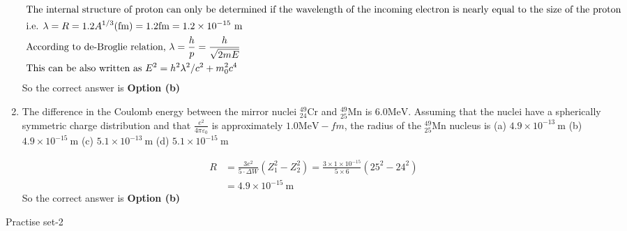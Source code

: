 \begin{enumerate}
\begin{tasks}
	\end{tasks}
\begin{answer}
	\begin{align*}
	\intertext{ The internal structure of proton can only be determined if the wavelength of the incoming electron is nearly equal to the size of the proton}
&\text{	i.e. $\lambda=R=1.2 A^{1 / 3}(\mathrm{fm})=1.2 \mathrm{fm}=1.2 \times 10^{-15} \mathrm{~m}$}\\
	&\text { According to de-Broglie relation, } \lambda=\frac{h}{p}=\frac{h}{\sqrt{2 m E}}\\
&\text { This can be also written as } E^2=h^2 \lambda^2 / c^2+m_0^2 c^4
	\end{align*}
	So the correct answer is \textbf{Option (b)}
\end{answer}
	\item  The difference in the Coulomb energy between the mirror nuclei ${ }_{24}^{49} \mathrm{Cr}$ and ${ }_{25}^{49} \mathrm{Mn}$ is $6.0 \mathrm{MeV}$. Assuming that the nuclei have a spherically symmetric charge distribution and that $\frac{e^2}{4 \pi \varepsilon_0}$ is approximately $1.0 \mathrm{MeV}-f m$, the radius of the ${ }_{25}^{49} \mathrm{Mn}$ nucleus is
	(a) $4.9 \times 10^{-13} \mathrm{~m}$
	(b) $4.9 \times 10^{-15} \mathrm{~m}$
	(c) $5.1 \times 10^{-13} \mathrm{~m}$
	(d) $5.1 \times 10^{-15} \mathrm{~m}$
	\begin{answer}
		\begin{align*}
		R&=\frac{3 e^2}{5 \cdot \Delta W}\left(Z_1^2-Z_2^2\right)=\frac{3 \times 1 \times 10^{-15}}{5 \times 6}\left(25^2-24^2\right)\\
		&=4.9 \times 10^{-15} \mathrm{~m}
		\end{align*}
			So the correct answer is \textbf{Option (b)}
	\end{answer}
\end{enumerate}
\newpage
\begin{abox}
	Practise set-2
\end{abox}
